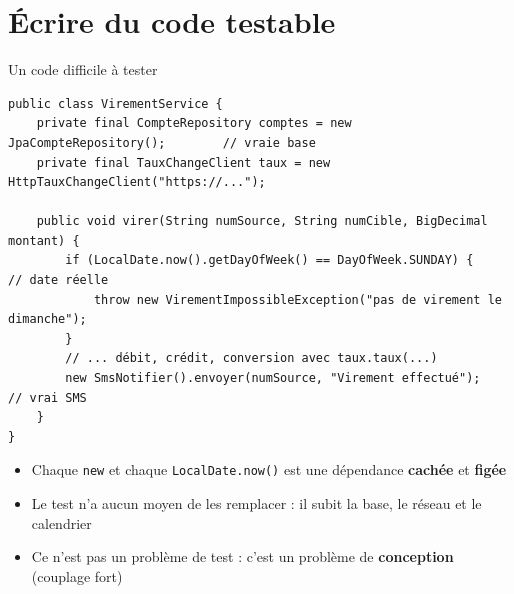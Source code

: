 \documentclass[aspectratio=169,10pt]{beamer}
\begin{document}
\section{Écrire du code testable}

\begin{frame}[fragile]{Un code difficile à tester}
\begin{lstlisting}[basicstyle=\lstcode\scriptsize]
public class VirementService {
    private final CompteRepository comptes = new JpaCompteRepository();        // vraie base
    private final TauxChangeClient taux = new HttpTauxChangeClient("https://...");

    public void virer(String numSource, String numCible, BigDecimal montant) {
        if (LocalDate.now().getDayOfWeek() == DayOfWeek.SUNDAY) {               // date réelle
            throw new VirementImpossibleException("pas de virement le dimanche");
        }
        // ... débit, crédit, conversion avec taux.taux(...)
        new SmsNotifier().envoyer(numSource, "Virement effectué");              // vrai SMS
    }
}
\end{lstlisting}
  \begin{itemize}
    \item Chaque \texttt{new} et chaque \texttt{LocalDate.now()} est une dépendance \textbf{cachée} et \textbf{figée}
    \item Le test n'a aucun moyen de les remplacer : il subit la base, le réseau et le calendrier
    \item Ce n'est pas un problème de test : c'est un problème de \textbf{conception} (couplage fort)
  \end{itemize}
\end{frame}

\end{document}

